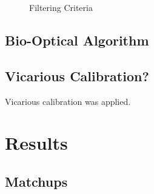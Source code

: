 \documentclass[onecolumn,3p,letterpaper,11pt]{elsarticle}
\begin{document}
\begin{figure}[ht]
{\begin{tikzpicture}[node distance=2.5cm]






\end{tikzpicture}
} %
	\caption{Filtering Criteria}
	\label{fig:FilteringCriteria}
\end{figure}
\subsection{Bio-Optical Algorithm}
\subsection{Vicarious Calibration?}
Vicarious calibration was applied.
\section{Results}
\label{sec:Results}
\subsection{Matchups}
\end{document}
